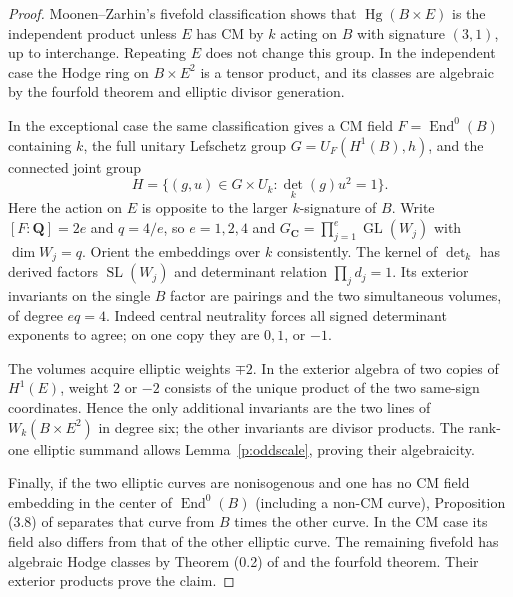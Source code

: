 \documentclass[11pt,reqno]{article}
\theoremstyle{emphasizedplain}
\theoremstyle{emphasizeddefinition}
\theoremstyle{emphasizeddefinition}
\DeclareMathOperator{\End}{End}
\DeclareMathOperator{\Hg}{Hg}
\DeclareMathOperator{\GL}{GL}
\DeclareMathOperator{\SL}{SL}
\newcommand{\Q}{\mathbf Q}
\newcommand{\C}{\mathbf C}
\begin{document}
\begin{proof}
Moonen--Zarhin's fivefold classification
\cite[Theorem (0.2) and \S5.11]{MZ} shows that $\Hg(B\times E)$
is the independent product unless $E$ has CM by $k$ acting on $B$
with signature $(3,1)$, up to interchange. Repeating $E$ does not
change this group. In the independent case the Hodge ring on
$B\times E^2$ is a tensor product, and its classes are algebraic
by the fourfold theorem and elliptic divisor generation.

In the exceptional case the same classification gives a CM field
$F=\End^0(B)$ containing $k$, the full unitary Lefschetz group
$G=U_F(H^1(B),h)$, and the connected joint group
\[
 H=\{(g,u)\in G\times U_k:\det_k(g)u^2=1\}.
\]
Here the action on $E$ is opposite to the larger $k$-signature of $B$.
Write $[F:\Q]=2e$ and $q=4/e$, so $e=1,2,4$ and
$G_\C=\prod_{j=1}^e\GL(W_j)$ with $\dim W_j=q$.
Orient the embeddings over $k$ consistently. The kernel of
$\det_k$ has derived factors $\SL(W_j)$ and determinant relation
$\prod_j d_j=1$. Its exterior invariants on the single $B$ factor
are pairings and the two simultaneous volumes, of degree $eq=4$.
Indeed central neutrality forces all signed determinant exponents
to agree; on one copy they are $0,1$, or $-1$.

The volumes acquire elliptic weights $\mp2$. In the exterior
algebra of two copies of $H^1(E)$, weight $2$ or $-2$ consists of
the unique product of the two same-sign coordinates. Hence the only
additional invariants are the two lines of $W_k(B\times E^2)$ in
degree six; the other invariants are divisor products. The rank-one
elliptic summand allows Lemma~\ref{p:oddscale}, proving their
algebraicity.

Finally, if the two elliptic curves are nonisogenous and one has
no CM field embedding in the center of $\End^0(B)$ (including
a non-CM curve), Proposition (3.8) of \cite{MZ} separates that curve
from $B$ times the other curve. In the CM case its field also differs
from that of the other elliptic curve. The remaining fivefold has
algebraic Hodge classes by Theorem (0.2) of \cite{MZ} and the
fourfold theorem. Their exterior products prove the claim.
\end{proof}
\end{document}

